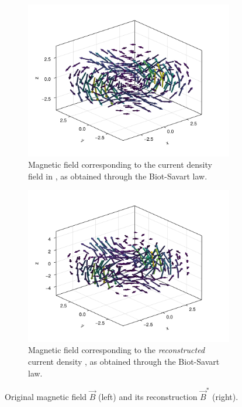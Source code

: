\documentclass[10pt]{article}
\begin{document}
  \begin{figure}[H]
    \centering
    \begin{subfigure}[t]{0.48\textwidth}
      \centering
      \includegraphics[width=\textwidth]{../figures/cdpr-b-field.pdf}
      \caption{Magnetic field corresponding to the current density field in , as obtained through the Biot-Savart law.}
      \label{fig:cdpr-b-field}
    \end{subfigure}
    \hfill
    \begin{subfigure}[t]{0.48\textwidth}
      \centering
      \includegraphics[width=\textwidth]{../figures/cdprr-b-field.pdf}
      \caption{Magnetic field corresponding to the \textit{reconstructed} current density , as obtained through the Biot-Savart law.}
      \label{fig:cdprr-b-field}
    \end{subfigure}
    \caption{Original magnetic field $\vec{B}$ (left) and its reconstruction $\vec{B}^*$ (right).}
  \end{figure}
\end{document}
